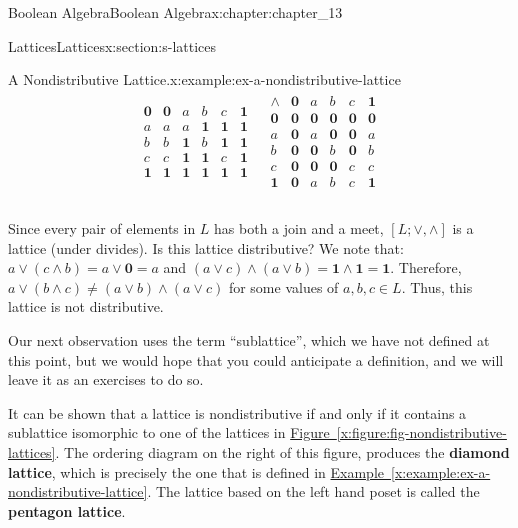 \documentclass[oneside,10pt,]{book}
\newcommand{\xreffont}{\relax}
\newcommand{\terminology}[1]{\textbf{#1}}
\numberwithin{equation}{section}
\begin{document}
\begin{chapterptx}{Boolean Algebra}{}{Boolean Algebra}{}{}{x:chapter:chapter_13}
\begin{sectionptx}{Lattices}{}{Lattices}{}{}{x:section:s-lattices}
\begin{example}{A Nondistributive Lattice.}{x:example:ex-a-nondistributive-lattice}
\begin{equation*}
\begin{array}{cc}
\begin{array}{c|ccccc}
\hline
\pmb{0} &	 \pmb{0} & a & b & c & \pmb{1} \\
a & 	 a & a & \pmb{1} & \pmb{1} & \pmb{1} \\
b &	 b & \pmb{1} & b & \pmb{1} & \pmb{1} \\
c &	 c & \pmb{1} & \pmb{1} & c & \pmb{1} \\
\pmb{1} &	 \pmb{1} & \pmb{1} & \pmb{1} & \pmb{1} & \pmb{1} \\
\end{array}
&
\begin{array}{c|ccccc}
\land  & 	 \pmb{0} &  a  & b  &  c &  \pmb{1} \\
\hline
\pmb{0} &	 \pmb{0} & \pmb{0} & \pmb{0} & \pmb{0} & \pmb{0} \\
a & 	  \pmb{0} & a &  \pmb{0} &  \pmb{0} &  a \\
b & 	 \pmb{0} & \pmb{0} & b &  \pmb{0} &  b \\
c & 	 \pmb{0} &  \pmb{0} &  \pmb{0} & c &  c \\
\pmb{1} &  \pmb{0} &  a &  b &  c & \pmb{1} \\
\end{array}\\
\end{array}
\end{equation*}
%
\par
Since every pair of elements in \(L\) has both a join and a meet, \([L; \lor  , \land ]\) is a lattice (under divides). Is this lattice distributive? We note that: \(a \lor  (c \land  b) = a \lor  \pmb{0} = a\) and \((a \lor  c) \land  (a \lor  b) = \pmb{1} \land  \pmb{1} = \pmb{1}\). Therefore, \(a \lor  (b \land  c) \neq  (a \lor  b) \land  (a \lor  c)\) for some values of \(a, b, c \in  L\). Thus, this lattice is not  distributive.%
\end{example}
Our next observation uses the term ``sublattice'', which we have not defined at this point, but we would hope that you could anticipate a definition, and we will leave it as an exercises to do so.%
\par
It can be shown that a lattice is nondistributive if and only if it contains a sublattice isomorphic to one of the lattices in \hyperref[x:figure:fig-nondistributive-lattices]{Figure~{\xreffont\ref{x:figure:fig-nondistributive-lattices}}}.  The ordering diagram on the right of this figure, produces the \terminology{diamond lattice}, which is precisely the one that is defined in \hyperref[x:example:ex-a-nondistributive-lattice]{Example~{\xreffont\ref{x:example:ex-a-nondistributive-lattice}}}.  The lattice based on the left hand poset is called the \terminology{pentagon lattice}.%

\end{sectionptx}
\end{chapterptx}
\end{document}

